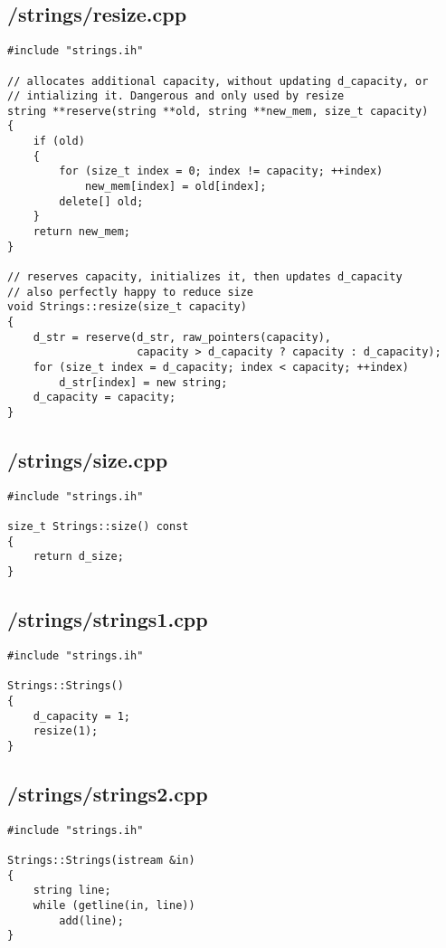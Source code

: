 \documentclass{article}
\begin{document}
\subsection*{/strings/resize.cpp}
\begin{verbatim}
#include "strings.ih"

// allocates additional capacity, without updating d_capacity, or
// intializing it. Dangerous and only used by resize
string **reserve(string **old, string **new_mem, size_t capacity)
{
    if (old)
    {
        for (size_t index = 0; index != capacity; ++index)
            new_mem[index] = old[index];
        delete[] old;
    }
    return new_mem;
}

// reserves capacity, initializes it, then updates d_capacity
// also perfectly happy to reduce size
void Strings::resize(size_t capacity)
{
    d_str = reserve(d_str, raw_pointers(capacity), 
                    capacity > d_capacity ? capacity : d_capacity);
    for (size_t index = d_capacity; index < capacity; ++index)
        d_str[index] = new string;
    d_capacity = capacity;  
}
\end{verbatim}
\subsection*{/strings/size.cpp}
\begin{verbatim}
#include "strings.ih"

size_t Strings::size() const
{
    return d_size;   
}
\end{verbatim}
\subsection*{/strings/strings1.cpp}
\begin{verbatim}
#include "strings.ih"

Strings::Strings()
{
    d_capacity = 1;
    resize(1);
}

\end{verbatim}
\subsection*{/strings/strings2.cpp}
\begin{verbatim}
#include "strings.ih"

Strings::Strings(istream &in)
{
    string line;
    while (getline(in, line))
        add(line);
}

\end{verbatim}
\end{document}
